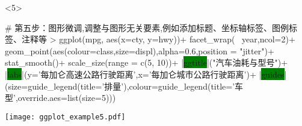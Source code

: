 \begin{frame}[c,fragile]{\subsecname}{\subsubsecname}
\begin{onlyenv}<5>
\begin{minipage}{\textwidth}
\begin{rcode}
# 第五步：图形微调,调整与图形无关要素,例如添加标题、坐标轴标签、图例标签、注释等
> ggplot(mpg, aes(x=cty, y=hwy))+
     facet_wrap(~ year,ncol=2)+     
     geom_point(aes(colour=class,size=displ),alpha=0.6,position = "jitter")+  
     stat_smooth()+  
     scale_size(range = c(5, 10))+
     |\colorbox{green}{ggtitle}|("汽车油耗与型号")+  
     |\colorbox{green}{labs}|(y='每加仑高速公路行驶距离',x='每加仑城市公路行驶距离')+  
     |\colorbox{green}{guides}|(size=guide_legend(title='排量'),colour=guide_legend(title='车型',override.aes=list(size=5)))
\end{rcode}
\end{minipage}
\begin{minipage}{\textwidth}
\centering
\texttt{[image: ggplot\_example5.pdf]}
\end{minipage}
\end{onlyenv}

\end{frame}
